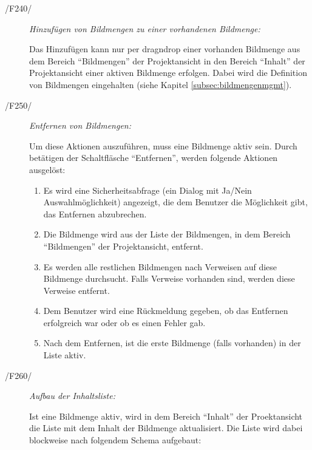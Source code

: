 \begin{description}
\begin{itemize}
\begin{itemize}
					\end{itemize}
				
			\end{itemize}
		
		\item[/F240/] \textit{Hinzufügen von Bildmengen zu einer vorhandenen Bildmenge:}\par Das Hinzufügen kann nur per \gls{dragndrop} einer vorhanden Bildmenge aus dem Bereich "`Bildmengen"' der Projektansicht in den Bereich "`Inhalt"' der Projektansicht einer aktiven Bildmenge erfolgen. Dabei wird die Definition von Bildmengen eingehalten (siehe Kapitel \ref{subsec:bildmengenmgmt}).
		
		\item[/F250/] \textit{Entfernen von Bildmengen:}\par Um diese Aktionen auszuführen, muss eine Bildmenge aktiv sein. Durch betätigen der Schaltfläsche "`Entfernen"', werden folgende Aktionen ausgelöst:
			
			\begin{enumerate}
			
				\item Es wird eine Sicherheitsabfrage (ein Dialog mit Ja/Nein Auswahlmöglichkeit) angezeigt, die dem Benutzer die Möglichkeit gibt, das Entfernen abzubrechen.
				
				\item Die Bildmenge wird aus der Liste der Bildmengen, in dem Bereich "`Bildmengen"' der Projektansicht, entfernt.
				
				\item Es werden alle restlichen Bildmengen nach Verweisen auf diese Bildmenge durchsucht. Falls Verweise vorhanden sind, werden diese Verweise entfernt.
				
				\item Dem Benutzer wird eine Rückmeldung gegeben, ob das Entfernen erfolgreich war oder ob es einen Fehler gab.
				
				\item Nach dem Entfernen, ist die erste Bildmenge (falls vorhanden) in der Liste aktiv.
			
			\end{enumerate}

		\item[/F260/] \textit{Aufbau der Inhaltsliste:}\par Ist eine Bildmenge aktiv, wird in dem Bereich "`Inhalt"' der Proektansicht die Liste mit dem Inhalt der Bildmenge aktualisiert. Die Liste wird dabei blockweise nach folgendem Schema aufgebaut:
		

\end{description}
